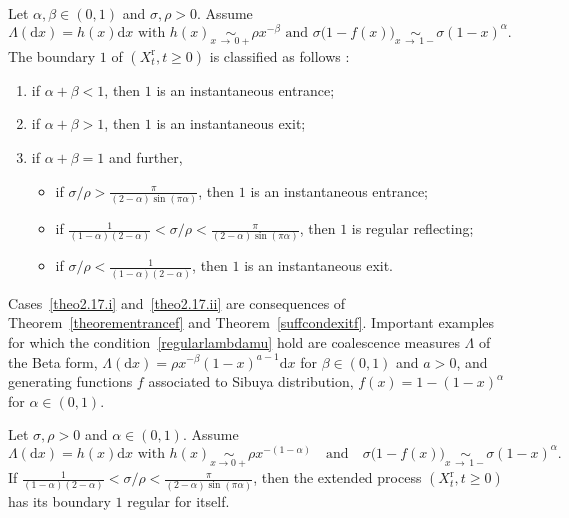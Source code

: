 \documentclass[AHL,Unicode,longabstracts,published]{cedram}
\newcommand{\ddr}{\mathrm{d}}
\newcommand{\rmr}{\mathrm{r}}
\newcommand*{\romanenumi}{\renewcommand*{\theenumi}{\roman{enumi}}}
\begin{document}
\begin{theo}\label{regularcase}
Let $\alpha,\beta\in (0,1)$ and $\sigma,\rho>0$. Assume
\begin{equation}\label{regularlambdamu}
\Lambda(\ddr x)=h(x)\ddr x \text{ with } h(x)\underset{x\,\rightarrow\,0+}{\sim}\rho x^{-\beta} \text{ and } \sigma \big(1-f(x)\big)\underset{x\,\rightarrow\,1-}{\sim} \sigma (1-x)^{\alpha}.
\end{equation}
The boundary $1$ of $(X_t^{\rmr},t\geq 0)$ is classified as follows :
\begin{enumerate}\romanenumi
\item \label{theo2.17.i}if $\alpha+\beta<1$, then $1$ is an instantaneous entrance;
\vspace*{1mm}
\item\label{theo2.17.ii} if $\alpha+\beta>1$, then $1$ is an instantaneous exit;
\vspace*{1mm}
\item\label{theo2.17.iii} if $\alpha+\beta=1$ and further,
\vspace*{2mm}
\begin{itemize}
\item if $\sigma/\rho>\frac{\pi}{(2-\alpha)\sin(\pi \alpha)}$, then $1$ is an instantaneous entrance;
\vspace*{2mm}
\item if $\frac{1}{(1-\alpha)(2-\alpha)}<\sigma/\rho<\frac{\pi}{(2-\alpha)\sin(\pi \alpha)}$, then $1$ is regular reflecting;
\vspace*{2mm}
\item if $\sigma/\rho<\frac{1}{(1-\alpha)(2-\alpha)}$, then $1$ is an instantaneous exit.
\end{itemize}
\end{enumerate}
\end{theo}

\begin{rema}
Cases~\eqref{theo2.17.i} and~\eqref{theo2.17.ii} are consequences of Theorem~\ref{theorementrancef} and Theorem~\ref{suffcondexitf}. Important examples for which the condition~\eqref{regularlambdamu} hold are coalescence measures $\Lambda$ of the Beta form, $\Lambda(\ddr x)=\rho x^{-\beta}(1-x)^{a-1} \ddr x$ for $\beta\in (0,1)$ and $a>0$, and generating functions $f$ associated to Sibuya distribution, $f(x)=1-(1-x)^{\alpha}$ for $\alpha\in (0,1)$.
\end{rema}

\begin{theo}\label{regularforitselfstable}
Let $\sigma,\rho>0$ and $\alpha \in (0,1)$.
Assume 
\[
\Lambda(\ddr x)=h(x)\ddr x \text{ with } h(x)\underset{x\rightarrow 0+}{\sim}\rho x^{-(1-\alpha)}
\quad
\text{and} 
\quad
\sigma\big(1-f(x)\big)\underset{x\,\rightarrow\,1-}{\sim} \sigma (1-x)^{\alpha}.
\]
If $\frac{1}{(1-\alpha)(2-\alpha)}<\sigma/\rho<\frac{\pi}{(2-\alpha)\sin(\pi \alpha)}$, then the extended process $(X_t^{\rmr},t\geq 0)$ has its boundary $1$ regular for itself.
\end{theo}
\end{document}
